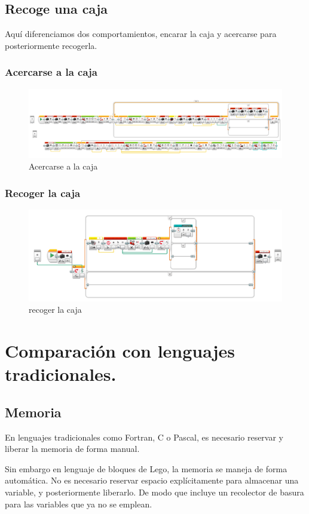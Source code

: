 \documentclass[12pt,a4paper]{article}
\begin{document}
\subsection{Recoge una caja}
Aquí diferenciamos dos comportamientos, encarar la caja y acercarse para posteriormente recogerla.
\subsubsection{Acercarse a la caja}
\begin{figure}[H]
	\caption{Acercarse a la caja}
	\includegraphics[scale=0.45]{RobotLuzMayorCaja.PNG}
	\centering
\end{figure}
\subsubsection{Recoger la caja} 
\begin{figure}[H]
	\caption{recoger la caja}
	\includegraphics[scale=0.45]{RobotCapturarCaja.PNG}
	\centering
\end{figure}

\section{Comparación con lenguajes tradicionales.}
\subsection{Memoria}
En lenguajes tradicionales como Fortran, C o Pascal, es necesario reservar y 
liberar la memoria de forma manual.

Sin embargo en lenguaje de bloques de Lego, la memoria se maneja de forma 
automática. No es necesario reservar espacio explícitamente para almacenar una 
variable, y posteriormente liberarlo. De modo que incluye un recolector de 
basura para las variables que ya no se emplean.
\end{document}
